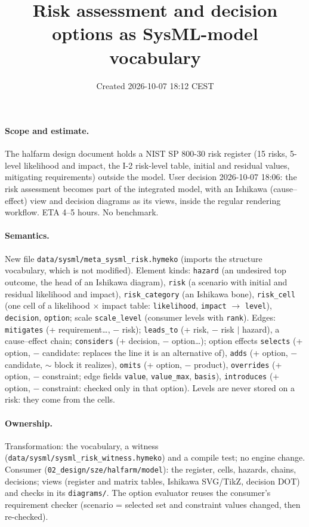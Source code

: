 \documentclass[11pt,a4paper]{article}
\title{Risk assessment and decision options as SysML-model vocabulary}
\date{Created 2026-10-07 18:12 CEST}
\begin{document}
\maketitle
\paragraph{Scope and estimate.} The halfarm design document holds a NIST SP 800-30 risk register
(15 risks, 5-level likelihood and impact, the I-2 risk-level table, initial and residual values,
mitigating requirements) outside the model. User decision 2026-10-07 18:06: the risk assessment
becomes part of the integrated model, with an Ishikawa (cause--effect) view and decision diagrams
as its views, inside the regular rendering workflow. ETA 4--5 hours. No benchmark.
\paragraph{Semantics.} New file \texttt{data/sysml/meta\_sysml\_risk.hymeko} (imports the structure
vocabulary, which is not modified). Element kinds: \texttt{hazard} (an undesired top outcome, the
head of an Ishikawa diagram), \texttt{risk} (a scenario with initial and residual likelihood and
impact), \texttt{risk\_category} (an Ishikawa bone), \texttt{risk\_cell} (one cell of a
likelihood $\times$ impact table: \texttt{likelihood}, \texttt{impact} $\to$ \texttt{level}),
\texttt{decision}, \texttt{option}; scale \texttt{scale\_level} (consumer levels with
\texttt{rank}). Edges: \texttt{mitigates} (+ requirement\ldots, $-$ risk); \texttt{leads\_to}
(+ risk, $-$ risk $|$ hazard), a cause--effect chain; \texttt{considers} (+ decision, $-$ option\ldots);
option effects \texttt{selects} (+ option, $-$ candidate: replaces the line it is an alternative
of), \texttt{adds} (+ option, $-$ candidate, $\sim$ block it realizes), \texttt{omits}
(+ option, $-$ product), \texttt{overrides} (+ option, $-$ constraint; edge fields \texttt{value},
\texttt{value\_max}, \texttt{basis}), \texttt{introduces} (+ option, $-$ constraint: checked only
in that option). Levels are never stored on a risk: they come from the cells.
\paragraph{Ownership.} Transformation: the vocabulary, a witness
(\texttt{data/sysml/sysml\_risk\_witness.hymeko}) and a compile test; no engine change. Consumer
(\texttt{02\_design/sze/halfarm/model}): the register, cells, hazards, chains, decisions; views
(register and matrix tables, Ishikawa SVG/TikZ, decision DOT) and checks in its \texttt{diagrams/}.
The option evaluator reuses the consumer's requirement checker (scenario = selected set and
constraint values changed, then re-checked).
\end{document}
